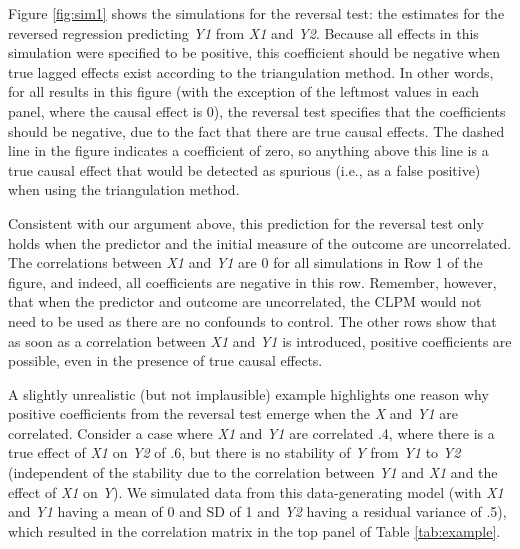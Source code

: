 \documentclass[
  man,floatsintext]{apa6}
\begin{document}
Figure \ref{fig:sim1} shows the simulations for the reversal test: the estimates for the reversed regression predicting \emph{Y1} from \emph{X1} and \emph{Y2}. Because all effects in this simulation were specified to be positive, this coefficient should be negative when true lagged effects exist according to the triangulation method. In other words, for all results in this figure (with the exception of the leftmost values in each panel, where the causal effect is 0), the reversal test specifies that the coefficients should be negative, due to the fact that there are true causal effects. The dashed line in the figure indicates a coefficient of zero, so anything above this line is a true causal effect that would be detected as spurious (i.e., as a false positive) when using the triangulation method.

Consistent with our argument above, this prediction for the reversal test only holds when the predictor and the initial measure of the outcome are uncorrelated. The correlations between \emph{X1} and \emph{Y1} are 0 for all simulations in Row 1 of the figure, and indeed, all coefficients are negative in this row. Remember, however, that when the predictor and outcome are uncorrelated, the CLPM would not need to be used as there are no confounds to control. The other rows show that as soon as a correlation between \emph{X1} and \emph{Y1} is introduced, positive coefficients are possible, even in the presence of true causal effects.

A slightly unrealistic (but not implausible) example highlights one reason why positive coefficients from the reversal test emerge when the \emph{X} and \emph{Y1} are correlated. Consider a case where \emph{X1} and \emph{Y1} are correlated .4, where there is a true effect of \emph{X1} on \emph{Y2} of .6, but there is no stability of \emph{Y} from \emph{Y1} to \emph{Y2} (independent of the stability due to the correlation between \emph{Y1} and \emph{X1} and the effect of \emph{X1} on \emph{Y}). We simulated data from this data-generating model (with \emph{X1} and \emph{Y1} having a mean of 0 and SD of 1 and \emph{Y2} having a residual variance of .5), which resulted in the correlation matrix in the top panel of Table \ref{tab:example}.
\end{document}
